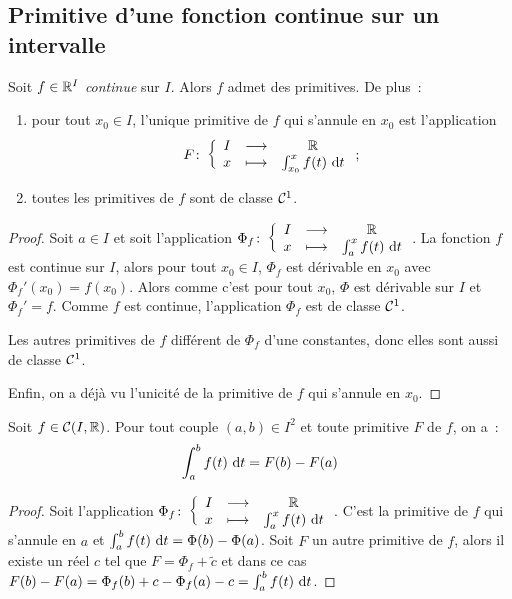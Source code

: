 \subsection{Primitive d'une fonction continue sur un intervalle}

\begin{theo}
  Soit \(f \in \mathbb{R}^I\) \emph{continue} sur \(I\). Alors \(f\) admet des 
  primitives. De plus~:
  \begin{enumerate}
    \item pour tout \(x_0 \in I\), l'unique primitive de \(f\) qui s'annule en 
      \(x_0\) est l'application
      \begin{equation}
        F\colon\left\{\begin{array}{ccc}I & \longrightarrow &\mathbb{R}\\x & \longmapsto & \int_{x_0}^x f(t)\,\mathop{}\mathopen{}\mathrm{d} t\end{array}\right.;
      \end{equation}
    \item toutes les primitives de \(f\) sont de classe \(\mathcal{C}^{1}\).
  \end{enumerate}
\end{theo}
\begin{proof}
  Soit \(a \in I\) et soit l'application 
  \(\Phi_f\colon\left\{\begin{array}{ccc}I & \longrightarrow &\mathbb{R}\\x & \longmapsto & \int_a^xf(t)\,\mathop{}\mathopen{}\mathrm{d} t\end{array}\right.\). La fonction \(f\) est 
  continue sur \(I\), alors pour tout \(x_0 \in I\), \(\Phi_f\) est dérivable en 
  \(x_0\) avec \(\Phi_f'(x_0) = f(x_0)\). Alors comme c'est pour tout \(x_0\), 
  \(\Phi\) est dérivable sur \(I\) et \(\Phi_f' = f\). Comme \(f\) est continue, 
  l'application \(\Phi_f\) est de classe \(\mathcal{C}^{1}\).

  Les autres primitives de \(f\) différent de \(\Phi_f\) d'une constantes, donc 
  elles sont aussi de classe \(\mathcal{C}^{1}\).

  Enfin, on a déjà vu l'unicité de la primitive de \(f\) qui s'annule en 
  \(x_0\).
\end{proof}

\begin{prop}
  Soit \(f \in \mathcal{C}(I,\mathbb{R})\). Pour tout couple \((a,b) \in I^2\) et toute 
  primitive \(F\) de \(f\), on a~:
  \begin{equation}
    \int_a^b f(t)\,\mathop{}\mathopen{}\mathrm{d} t = F(b)-F(a)
  \end{equation}
\end{prop}
\begin{proof}
  Soit l'application \(\Phi_f\colon\left\{\begin{array}{ccc}I & \longrightarrow &\mathbb{R}\\x & \longmapsto & \int_a^xf(t)\,\mathop{}\mathopen{}\mathrm{d} t\end{array}\right.\). 
  C'est la primitive de \(f\) qui s'annule en \(a\) et \(\int_a^b f(t)\,\mathop{}\mathopen{}\mathrm{d} 
  t = \Phi(b)-\Phi(a)\). Soit \(F\) un autre primitive de \(f\), alors il existe 
  un réel \(c\) tel que \(F = \Phi_f +\tilde{c}\) et dans ce cas 
  \(F(b)-F(a) = \Phi_f(b)+c - \Phi_f(a)-c = \int_a^bf(t)\,\mathop{}\mathopen{}\mathrm{d} t\).
\end{proof}

